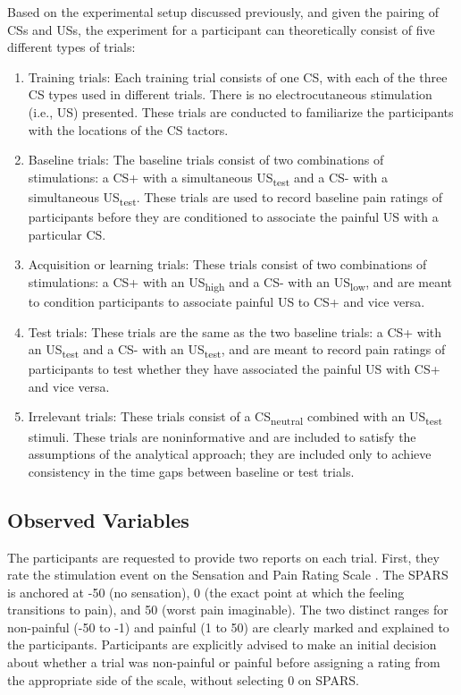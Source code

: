 \documentclass{article}
\begin{document}
Based on the experimental setup discussed previously, and given the pairing of CSs and USs, the experiment for a participant can theoretically consist of five different types of trials:


\begin{enumerate}

  \item Training trials: Each training trial consists of one CS, with each of the three CS types used in different trials. There is no electrocutaneous stimulation (i.e., US) presented. These trials are conducted to familiarize the participants with the locations of the CS tactors. 


  \item Baseline trials: The baseline trials consist of two combinations of stimulations: a CS+ with a simultaneous US\textsubscript{test} and a CS- with a simultaneous US\textsubscript{test}. These trials are used to record baseline pain ratings of participants before they are conditioned to associate the painful US with a particular CS.

 
  \item Acquisition or learning trials: These trials consist of two combinations of stimulations: a CS+ with an US\textsubscript{high} and a CS- with an US\textsubscript{low}, and are meant to condition participants to associate painful US to CS+ and vice versa.

 
  \item Test trials: These trials are the same as the two baseline trials: a CS+ with an US\textsubscript{test} and a CS- with an US\textsubscript{test}, and are meant to record pain ratings of participants to test whether they have associated the painful US with CS+ and vice versa.

 
  \item Irrelevant trials: These trials consist of a CS\textsubscript{neutral} combined with an US\textsubscript{test} stimuli. These trials are noninformative and are included to satisfy the assumptions of the analytical approach; they are included only to achieve consistency in the time gaps between baseline or test trials. 


  

\end{enumerate}
\subsection{Observed Variables} 

The participants are requested to provide two reports on each trial. First, they rate the stimulation event on the Sensation and Pain Rating Scale \autocite{bib44} \autocite{bib40}. The SPARS is anchored at -50 (no sensation), 0 (the exact point at which the feeling transitions to pain), and 50 (worst pain imaginable). The two distinct ranges for non-painful (-50 to -1) and painful (1 to 50) are clearly marked and explained to the participants. Participants are explicitly advised to make an initial decision about whether a trial was non-painful or painful before assigning a rating from the appropriate side of the scale, without selecting 0 on SPARS. 
\end{document}
